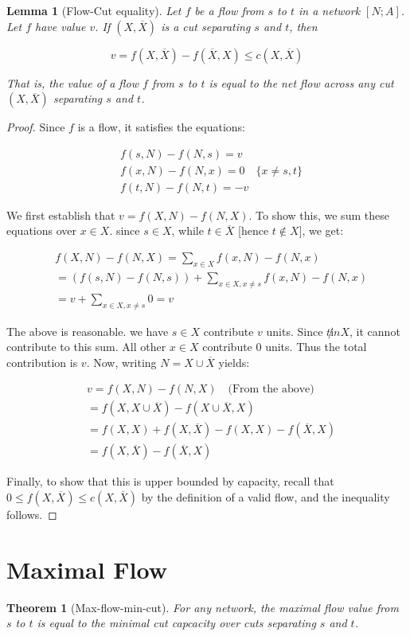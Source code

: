 \documentclass[titlepage]{article}
\newcommand{\Xbar}{\ensuremath{\overline{X}}}
\theoremstyle{plain}
\newtheorem{theorem}{Theorem}
\newtheorem{lemma}{Lemma}[theorem]
\theoremstyle{definition}
\theoremstyle{remark}
\begin{document}
\begin{lemma}[Flow-Cut equality]
    Let $f$ be a flow from $s$ to $t$ in a network $[N; A]$. Let $f$ have
    value $v$. If $(X, \Xbar)$ is a cut separating $s$ and $t$, then

\begin{equation}
    \tag{Flow-Cut equality}
    v = f(X, \Xbar) - f(\Xbar, X) \leq c(X, \Xbar) 
    \label{eqn:flow-cut-equality}
\end{equation}

That is, the value of a flow $f$ from $s$ to $t$ is equal to the net flow
across any cut $(X, \Xbar)$ separating $s$ and $t$.
\end{lemma}
\begin{proof}
Since $f$ is a flow, it satisfies the equations:

\begin{align*}
    &f(s, N) - f(N, s) = v \\
    &f(x, N) - f(N, x) = 0 \quad \{x \neq s, t\} \\
    &f(t, N) - f(N, t) = -v
\end{align*}

We first establish that $v = f(X, N) - f(N, X)$. To show this, we sum these
equations over $x \in X$. since $s \in X$, while $t \in \Xbar$ [hence $t \not \in X]$, we get:

\begin{align*}
    &f(X, N) - f(N, X) = \sum_{x \in X} f(x, N) - f(N, x)\\
    &= (f(s, N) - f(N, s)) + \sum_{x \in X, x \neq s} f(x, N) - f(N, x) \\
    &= v + \sum_{x \in X, x \neq s} 0 = v
\end{align*}

The above is reasonable. we have $s \in X$ contribute $v$ units. 
Since $t \not in X$, it cannot contribute to this sum. All other
$x \in X$ contribute $0$ units. Thus the total contribution is $v$.  Now, writing $N = X \cup \Xbar$ yields:

\begin{align*}
&v = f(X, N) - f(N, X) \quad \text{(From the above)} \\
&= f(X, X \cup \Xbar) - f(X \cup \Xbar, X) \\
&= f(X, X) + f(X, \Xbar) - f(X, X) - f(\Xbar, X) \\
&= f(X, \Xbar) - f(\Xbar, X)
\end{align*}

Finally, to show that this is upper bounded by capacity, recall that $0 \leq f(X, \Xbar) \leq c(X, \Xbar)$
by the definition of a valid flow, and the inequality follows.

\end{proof}

\section{Maximal Flow}
\begin{theorem}[Max-flow-min-cut]
    For any network, the maximal flow value from $s$ to $t$ is equal to the 
    minimal cut capcacity over cuts separating $s$ and $t$.
\end{theorem}




\nocite{*}
\end{document}
